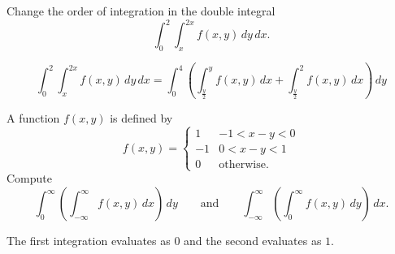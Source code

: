\question Change the order of integration in the double integral
\[
    \int_0^2 \int_x^{2x} f(x,y) \,dy\,dx.
\]
\begin{solution}
    \[    
        \int_0^2 \int_x^{2x} f(x,y) \,dy\,dx
        = \int_0^4
        \left(
            \int^{y}_{\frac y2} f(x,y) \,dx
            + \int^2_{\frac y2} f(x,y) \,dx
        \right)
        \,dy
    \]
\end{solution}

\question A function $f(x,y)$ is defined by
\[
    f(x,y)=
    \begin{cases}
        1 & -1 < x-y < 0 \\
        -1 & 0 < x-y < 1 \\
        0 & \text{otherwise}.
    \end{cases}
\]
Compute
\[
    \int_0^{\infty}
    \left( \int_{-\infty}^\infty f(x,y) \,dx \right) \,dy
    \qquad \text{and} \qquad
    \int_{-\infty}^{\infty}
    \left( \int_{0}^\infty f(x,y) \,dy \right) \,dx.
\]
\begin{solution}
    The first integration evaluates as $0$
    and the second evaluates as $1$.
\end{solution}
